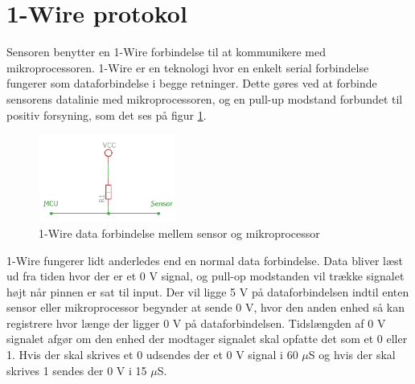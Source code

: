 \section{1-Wire protokol}
Sensoren benytter en 1-Wire forbindelse til at kommunikere med mikroprocessoren. 1-Wire er en teknologi hvor en  enkelt serial forbindelse fungerer som dataforbindelse i begge retninger. Dette gøres ved at forbinde sensorens datalinie med mikroprocessoren, og en pull-up modstand forbundet til positiv forsyning, som det ses på figur \ref{one_wire_schematic}. 

\begin{figure}[h!]
  \centering
  \includegraphics[width=0.4\textwidth]{figures/onewire_eksempel.png}
  \caption{1-Wire data forbindelse mellem sensor og mikroprocessor}
  \label{one_wire_schematic}
\end{figure}

1-Wire fungerer lidt anderledes end en normal data forbindelse. Data bliver læst ud fra tiden hvor der er et 0 V signal, og pull-op modstanden vil trække signalet højt når pinnen er sat til input. Der vil ligge 5 V på dataforbindelsen indtil enten sensor eller mikroprocessor begynder at sende 0 V, hvor den anden enhed så kan registrere hvor længe der ligger 0 V på dataforbindelsen. Tidslængden af 0 V signalet afgør om den enhed der modtager signalet skal opfatte det som et 0 eller 1. Hvis der skal skrives et 0 udsendes der et 0 V signal i 60 $\mu$S og hvis der skal skrives 1 sendes der 0 V i 15 $\mu$S. 

